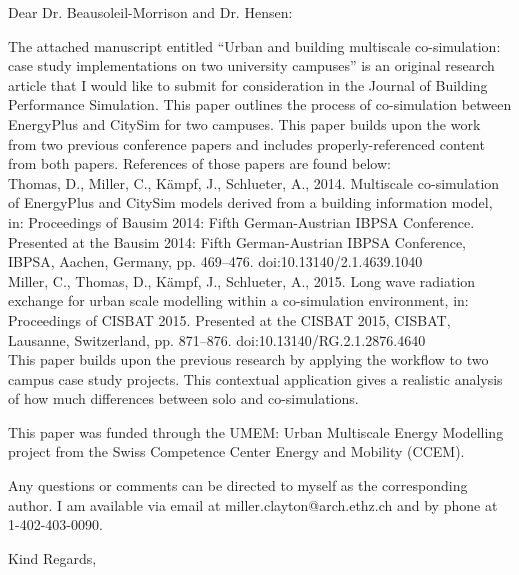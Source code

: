 \documentclass[english]{ethbrief3}
\begin{document}
\opening{Dear Dr. Beausoleil-Morrison and Dr. Hensen:}

The attached manuscript entitled “Urban and building multiscale co-simulation: case study implementations on two university campuses” is an original research article that I would like to submit for consideration in the Journal of Building Performance Simulation. This paper outlines the process of co-simulation between EnergyPlus and CitySim for two campuses. This paper builds upon the work from two previous conference papers and includes properly-referenced content from both papers. References of those papers are found below: \\[12pt]
Thomas, D., Miller, C., Kämpf, J., Schlueter, A., 2014. Multiscale co-simulation of EnergyPlus and CitySim models derived from a building information model, in: Proceedings of Bausim 2014: Fifth German-Austrian IBPSA Conference. Presented at the Bausim 2014: Fifth German-Austrian IBPSA Conference, IBPSA, Aachen, Germany, pp. 469–476. doi:10.13140/2.1.4639.1040\\[12pt]

Miller, C., Thomas, D., Kämpf, J., Schlueter, A., 2015. Long wave radiation exchange for urban scale modelling within a co-simulation environment, in: Proceedings of CISBAT 2015. Presented at the CISBAT 2015, CISBAT, Lausanne, Switzerland, pp. 871–876. doi:10.13140/RG.2.1.2876.4640\\[12pt]
This paper builds upon the previous research by applying the workflow to two campus case study projects. This contextual application gives a realistic analysis of how much differences between solo and co-simulations.

This paper was funded through the UMEM: Urban Multiscale Energy Modelling project from the Swiss Competence Center Energy and Mobility (CCEM).

Any questions or comments can be directed to myself as the corresponding author. I am available via email at miller.clayton@arch.ethz.ch and by phone at 1-402-403-0090.

\closing{Kind Regards,}


\end{document}
